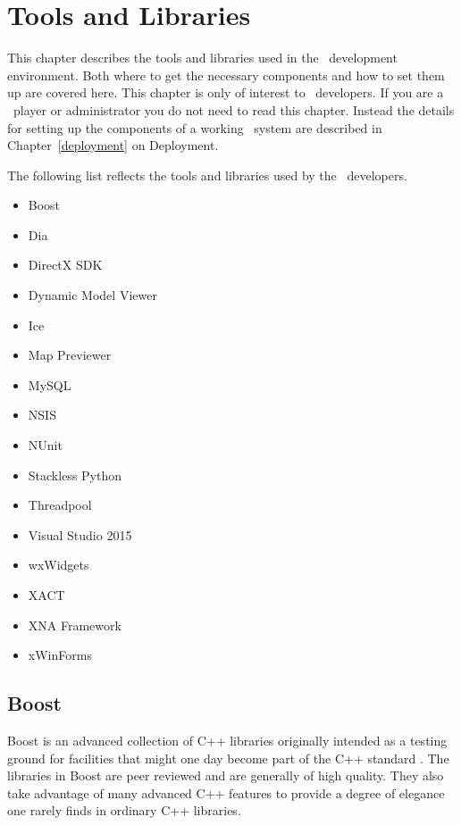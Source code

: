 %

\chapter{Tools and Libraries}
\label{toolslibraries}

This chapter describes the tools and libraries used in the \VTank\ development environment. Both
where to get the necessary components and how to set them up are covered here. This chapter is
only of interest to \VTank\ developers. If you are a \VTank\ player or administrator you do not
need to read this chapter. Instead the details for setting up the components of a working
\VTank\ system are described in Chapter~\ref{deployment} on Deployment.

The following list reflects the tools and libraries used by the \VTank\ developers.

\begin{itemize}
\item Boost \cite{boost}
\item Dia \cite{dia}
\item DirectX SDK
\item Dynamic Model Viewer
\item Ice \cite{ice}
\item Map Previewer
\item MySQL
\item NSIS
\item NUnit
\item Stackless Python
\item Threadpool \cite{threadpool}
\item Visual Studio 2015
\item wxWidgets \cite{wxWidgets}
\item XACT
\item XNA Framework
\item xWinForms
\end{itemize}

\section{Boost}

Boost is an advanced collection of C++ libraries originally intended as a testing ground for
facilities that might one day become part of the C++ standard \cite{boost}. The libraries in
Boost are peer reviewed and are generally of high quality. They also take advantage of many
advanced C++ features to provide a degree of elegance one rarely finds in ordinary C++
libraries.

